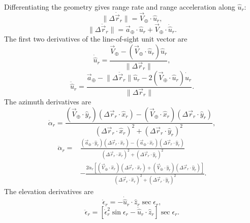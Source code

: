 Differentiating the geometry gives range rate and range acceleration along
$\hat u_r$:
\begin{equation}
  \lVert\Delta\dot{\vec r}_r\rVert
  =\vec V_{\oplus}\cdot\hat u_r,
  \label{eq:radar-range-rate}
\end{equation}
\begin{equation}
  \lVert\Delta\ddot{\vec r}_r\rVert
  =\vec a_{\oplus}\cdot\hat u_r
   +\vec V_{\oplus}\cdot\dot{\hat u}_r.
  \label{eq:radar-range-acceleration}
\end{equation}
The first two derivatives of the line-of-sight unit vector are
\begin{equation}
  \dot{\hat u}_r
  =\frac{\vec V_{\oplus}
         -(\vec V_{\oplus}\cdot\hat u_r)\hat u_r}
        {\lVert\Delta\vec r_r\rVert},
  \label{eq:radar-unit-vector-rate}
\end{equation}
\begin{equation}
  \ddot{\hat u}_r
  =\frac{\vec a_{\oplus}
         -\lVert\Delta\ddot{\vec r}_r\rVert\hat u_r
         -2(\vec V_{\oplus}\cdot\hat u_r)\dot{\hat u}_r}
        {\lVert\Delta\vec r_r\rVert}.
  \label{eq:radar-unit-vector-acceleration}
\end{equation}
The azimuth derivatives are
\begin{equation}
  \dot\alpha_r
  =\frac{
   (\vec V_{\oplus}\cdot\hat y_r)(\Delta\vec r_r\cdot\hat x_r)
  -(\vec V_{\oplus}\cdot\hat x_r)(\Delta\vec r_r\cdot\hat y_r)}
  {(\Delta\vec r_r\cdot\hat x_r)^2
  +(\Delta\vec r_r\cdot\hat y_r)^2},
  \label{eq:radar-azimuth-rate}
\end{equation}
\begin{equation}
\begin{aligned}
  \ddot\alpha_r={}&
  \frac{
   (\vec a_{\oplus}\cdot\hat y_r)(\Delta\vec r_r\cdot\hat x_r)
  -(\vec a_{\oplus}\cdot\hat x_r)(\Delta\vec r_r\cdot\hat y_r)}
  {(\Delta\vec r_r\cdot\hat x_r)^2
  +(\Delta\vec r_r\cdot\hat y_r)^2}\\
  &-\frac{2\dot\alpha_r\left[
    (\vec V_{\oplus}\cdot\hat x_r)(\Delta\vec r_r\cdot\hat x_r)
   +(\vec V_{\oplus}\cdot\hat y_r)(\Delta\vec r_r\cdot\hat y_r)
   \right]}
  {(\Delta\vec r_r\cdot\hat x_r)^2
  +(\Delta\vec r_r\cdot\hat y_r)^2}.
\end{aligned}
\label{eq:radar-azimuth-acceleration}
\end{equation}
The elevation derivatives are
\begin{equation}
  \dot\epsilon_r
  =-\dot{\hat u}_r\cdot\hat z_r\sec\epsilon_r,
  \label{eq:radar-elevation-rate}
\end{equation}
\begin{equation}
  \ddot\epsilon_r
  =\left[\dot\epsilon_r^2\sin\epsilon_r
         -\ddot{\hat u}_r\cdot\hat z_r\right]\sec\epsilon_r.
  \label{eq:radar-elevation-acceleration}
\end{equation}

